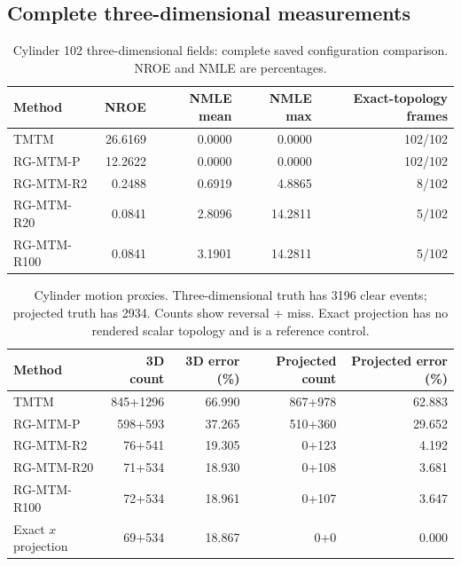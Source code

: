 \subsection{Complete three-dimensional measurements}
\begin{table}[H]\centering\small
\caption{Cylinder 102 three-dimensional fields: complete saved configuration comparison. NROE and NMLE are percentages.}
\begin{tabular}{lrrrr}\toprule Method & NROE & NMLE mean & NMLE max & Exact-topology frames\\\midrule
TMTM & 26.6169 & 0.0000 & 0.0000 & 102/102\\
RG-MTM-P & 12.2622 & 0.0000 & 0.0000 & 102/102\\
RG-MTM-R2 & 0.2488 & 0.6919 & 4.8865 & 8/102\\
RG-MTM-R20 & 0.0841 & 2.8096 & 14.2811 & 5/102\\
RG-MTM-R100 & 0.0841 & 3.1901 & 14.2811 & 5/102\\
\bottomrule\end{tabular}\end{table}

\begin{table}[H]\centering\small
\caption{Cylinder motion proxies. Three-dimensional truth has 3196 clear events; projected truth has 2934. Counts show reversal + miss. Exact projection has no rendered scalar topology and is a reference control.}
\begin{tabular}{lrrrr}\toprule Method & 3D count & 3D error (\%) & Projected count & Projected error (\%)\\\midrule
TMTM & 845+1296 & 66.990 & 867+978 & 62.883\\
RG-MTM-P & 598+593 & 37.265 & 510+360 & 29.652\\
RG-MTM-R2 & 76+541 & 19.305 & 0+123 & 4.192\\
RG-MTM-R20 & 71+534 & 18.930 & 0+108 & 3.681\\
RG-MTM-R100 & 72+534 & 18.961 & 0+107 & 3.647\\
Exact $x$ projection & 69+534 & 18.867 & 0+0 & 0.000\\
\bottomrule\end{tabular}\end{table}

